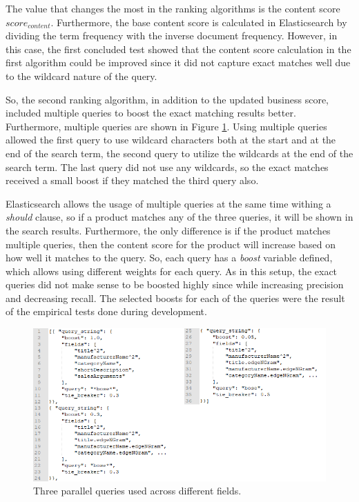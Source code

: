 The value that changes the most in the ranking algorithms is the content score $score_{content}$.
Furthermore, the base content score is calculated in Elasticsearch by dividing the term frequency with the
inverse document frequency.
However, in this case, the first concluded test showed that the content score calculation in the first algorithm
could be improved since it did not capture exact matches well due to the wildcard nature of the query.

So, the second ranking algorithm, in addition to the updated business score, 
included multiple queries to boost the exact matching results better. 
Furthermore, multiple queries are shown in Figure \ref{fig:new-query}.
Using multiple queries allowed the first query to use wildcard characters both at the start and at the end of 
the search term, the second query to utilize the wildcards at the end of the search term.
The last query did not use any wildcards, so the exact matches received a small boost if they matched 
the third query also.


Elasticsearch allows the usage of multiple queries at the same time withing a \emph{should} clause, so
if a product matches any of the three queries, it will be shown in the search results.
Furthermore, the only difference is if the product matches multiple queries, then the content score
for the product will increase based on how well it matches to the query.
So, each query has a \emph{boost} variable defined, which allows using different weights
for each query. 
As in this setup, the exact queries did not make sense to be boosted highly since while increasing
precision and decreasing recall.
The selected boosts for each of the queries were the result of the empirical tests done during
development.


\begin{figure}
    \centering
    \includegraphics[width=\textwidth]{img/new-query-v.png}
    \caption{Three parallel queries used across different fields.}
    \label{fig:new-query}
\end{figure}


